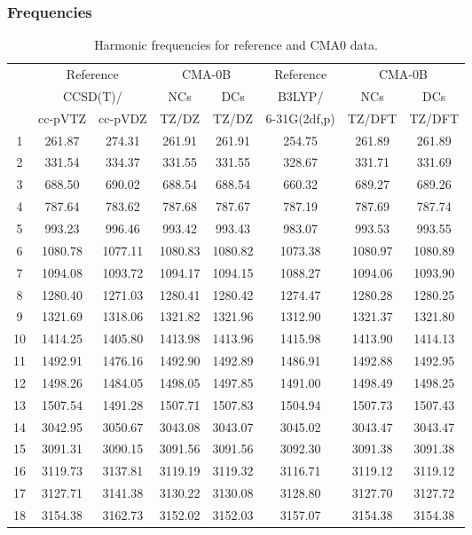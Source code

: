 \documentclass[10pt,oneside]{article}
\begin{document}
\subsubsection*{Frequencies}
\begin{table}[h!]
\centering
\caption{Harmonic frequencies for reference and CMA0 data.}
\begin{tabular}{cccccccc}
\toprule
{} & \multicolumn{2}{c}{Reference} & \multicolumn{2}{c}{CMA-0B} &    Reference & \multicolumn{2}{c}{CMA-0B} \\
{} & \multicolumn{2}{c}{CCSD(T)/} &     NCs &     DCs &       B3LYP/ &     NCs &     DCs \\
{} &   cc-pVTZ & cc-pVDZ &   TZ/DZ &   TZ/DZ & 6-31G(2df,p) &  TZ/DFT &  TZ/DFT \\
\midrule
1  &    261.87 &  274.31 &  261.91 &  261.91 &       254.75 &  261.89 &  261.89 \\
2  &    331.54 &  334.37 &  331.55 &  331.55 &       328.67 &  331.71 &  331.69 \\
3  &    688.50 &  690.02 &  688.54 &  688.54 &       660.32 &  689.27 &  689.26 \\
4  &    787.64 &  783.62 &  787.68 &  787.67 &       787.19 &  787.69 &  787.74 \\
5  &    993.23 &  996.46 &  993.42 &  993.43 &       983.07 &  993.53 &  993.55 \\
6  &   1080.78 & 1077.11 & 1080.83 & 1080.82 &      1073.38 & 1080.97 & 1080.89 \\
7  &   1094.08 & 1093.72 & 1094.17 & 1094.15 &      1088.27 & 1094.06 & 1093.90 \\
8  &   1280.40 & 1271.03 & 1280.41 & 1280.42 &      1274.47 & 1280.28 & 1280.25 \\
9  &   1321.69 & 1318.06 & 1321.82 & 1321.96 &      1312.90 & 1321.37 & 1321.80 \\
10 &   1414.25 & 1405.80 & 1413.98 & 1413.96 &      1415.98 & 1413.90 & 1414.13 \\
11 &   1492.91 & 1476.16 & 1492.90 & 1492.89 &      1486.91 & 1492.88 & 1492.95 \\
12 &   1498.26 & 1484.05 & 1498.05 & 1497.85 &      1491.00 & 1498.49 & 1498.25 \\
13 &   1507.54 & 1491.28 & 1507.71 & 1507.83 &      1504.94 & 1507.73 & 1507.43 \\
14 &   3042.95 & 3050.67 & 3043.08 & 3043.07 &      3045.02 & 3043.47 & 3043.47 \\
15 &   3091.31 & 3090.15 & 3091.56 & 3091.56 &      3092.30 & 3091.38 & 3091.38 \\
16 &   3119.73 & 3137.81 & 3119.19 & 3119.32 &      3116.71 & 3119.12 & 3119.12 \\
17 &   3127.71 & 3141.38 & 3130.22 & 3130.08 &      3128.80 & 3127.70 & 3127.72 \\
18 &   3154.38 & 3162.73 & 3152.02 & 3152.03 &      3157.07 & 3154.38 & 3154.38 \\
\bottomrule
\end{tabular}
\end{table}
\end{document}
